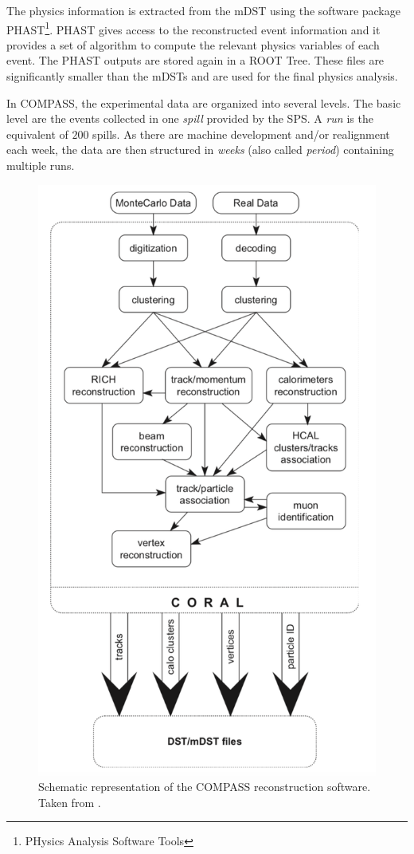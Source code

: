 The physics information is extracted from the mDST using the software package PHAST\footnote{PHysics Analysis Software Tools}. PHAST gives access to the reconstructed event information and it provides a set of algorithm to compute the relevant physics variables of each event. The PHAST outputs are stored again in a ROOT Tree. These files are significantly smaller than the mDSTs and are used for the final physics analysis.

In COMPASS, the experimental data are organized into several levels. The basic level are the events collected in one \textit{spill} provided by the SPS. A \textit{run} is the equivalent of $200$ spills. As there are machine development and/or realignment each week, the data are then structured in \textit{weeks} (also called \textit{period}) containing multiple runs.

\begin{figure}[!h]
  \centering
	\includegraphics[scale=0.55]{./gfx/CORAL.png}
	\caption{Schematic representation of the COMPASS reconstruction software. Taken from \cite{NIM}.}
	\label{pic:CORAL}
\end{figure}
